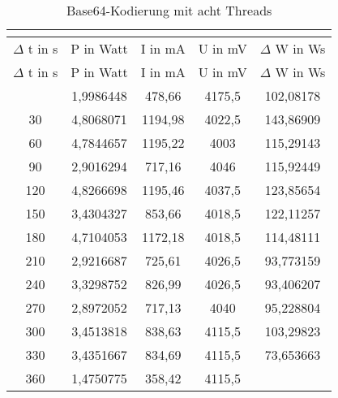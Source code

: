 
\begin{longtable}[c]{ccccc}
\caption{Base64-Kodierung mit acht Threads} \\
\label{tab:Base64MessungThreadAcht}\\
\hline
{$\Delta$ t in s} & {P in Watt} & {I in mA} & {U in mV} & {$\Delta$ W in Ws} \\
\hline
\endfirsthead
\hline
$\Delta$ t in s & P in Watt & I in mA & U in mV & $\Delta$ W in Ws \\
\hline
\endhead
\hline
\endfoot
\hline
 \midrule
    0     & 1,9986448 & 478,66 & 4175,5 & 102,08178 \\
    \midrule
    30    & 4,8068071 & 1194,98 & 4022,5 & 143,86909 \\
    \midrule
    60    & 4,7844657 & 1195,22 & 4003  & 115,29143 \\
    \midrule
    90    & 2,9016294 & 717,16 & 4046  & 115,92449 \\
    \midrule
    120   & 4,8266698 & 1195,46 & 4037,5 & 123,85654 \\
    \midrule
    150   & 3,4304327 & 853,66 & 4018,5 & 122,11257 \\
    \midrule
    180   & 4,7104053 & 1172,18 & 4018,5 & 114,48111 \\
    \midrule
    210   & 2,9216687 & 725,61 & 4026,5 & 93,773159 \\
    \midrule
    240   & 3,3298752 & 826,99 & 4026,5 & 93,406207 \\
    \midrule
    270   & 2,8972052 & 717,13 & 4040  & 95,228804 \\
    \midrule
    300   & 3,4513818 & 838,63 & 4115,5 & 103,29823 \\
    \midrule
    330   & 3,4351667 & 834,69 & 4115,5 & 73,653663 \\
    \midrule
    360   & 1,4750775 & 358,42 & 4115,5 &  \\
\end{longtable}